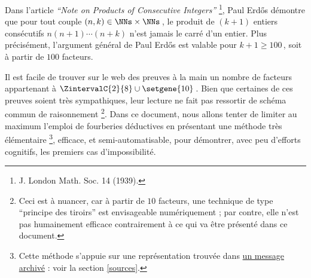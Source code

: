 Dans l'article \emph{\enquote{Note on Products of Consecutive Integers}}
\footnote{
	J. London Math. Soc. 14 (1939).
},
Paul Erdős démontre que pour tout couple $(n, k) \in \NNs \times \NNs$\,, le produit de $(k+1)$ entiers consécutifs $n (n + 1) \cdots (n + k)$ n'est jamais le carré d'un entier.
Plus précisément, l'argument général de Paul Erdős est valable pour $k + 1 \geq 100$\,, soit à partir de $100$ facteurs.

\smallskip

Il est facile de trouver sur le web des preuves à la main un nombre de facteurs appartenant à $\ZintervalC{2}{8} \cup \setgene{10}$\,.
Bien que certaines de ces preuves soient très sympathiques, leur lecture ne fait pas ressortir de schéma commun de raisonnement
\footnote{
	Ceci est à nuancer, car à partir de $10$ facteurs, une technique de type \enquote{principe des tiroirs} est envisageable numériquement ; par contre, elle n'est pas humainement efficace contrairement à ce qui va être présenté dans ce document.
}.
%
Dans ce document, nous allons tenter de limiter au maximum l'emploi de fourberies déductives en présentant une méthode très élémentaire
\footnote{
	Cette méthode s'appuie sur une représentation trouvée dans \href{https://web.archive.org/web/20171110144534/http://mathforum.org/library/drmath/view/65589.html}{un message archivé} : voir la section \ref{sources}.
},
efficace, et semi-automatisable, pour démontrer, avec peu d'efforts cognitifs, les premiers cas d'impossibilité.

